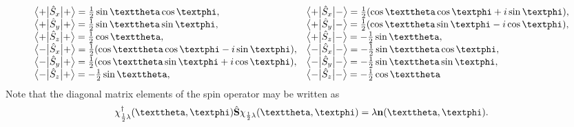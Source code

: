 \begin{equation}
\begin{array}{ll}
\braOket{+}{\hat{S}_{x}}{+}=\frac{1}{2} \sin \vartheta \cos \varphi, & \braOket{+}{\hat{S}_{x}}{-}=\frac{1}{2}(\cos \vartheta \cos \varphi+i \sin \varphi), \\
\braOket{+}{\hat{S}_{y}}{+}=\frac{1}{2} \sin \vartheta \sin \varphi, & \braOket{+}{\hat{S}_{y}}{-}=\frac{1}{2}(\cos \vartheta \sin \varphi-i \cos \varphi), \\
\braOket{+}{\hat{S}_{z}}{+}=\frac{1}{2} \cos \vartheta, & \braOket{+}{\hat{S}_{z}}{-}=-\frac{1}{2} \sin \vartheta, \label{eq:6:2:30}\\
\braOket{-}{\hat{S}_{x}}{+}=\frac{1}{2}(\cos \vartheta \cos \varphi-i \sin \varphi), & \braOket{-}{\hat{S}_{x}}{-}=-\frac{1}{2} \sin \vartheta \cos \varphi, \\
\braOket{-}{\hat{S}_{y}}{+}=\frac{1}{2}(\cos \vartheta \sin \varphi+i \cos \varphi), & \braOket{-}{\hat{S}_{y}}{-}=-\frac{1}{2} \sin \vartheta \sin \varphi, \\
\braOket{-}{\hat{S}_{z}}{+}=-\frac{1}{2} \sin \vartheta, & \braOket{-}{\hat{S}_{z}}{-}=-\frac{1}{2} \cos \vartheta
\end{array}
\end{equation}
Note that the diagonal matrix elements of the spin operator may be written as
\begin{equation}
\chi_{\frac{1}{2} \lambda}^{\dagger}(\vartheta, \varphi) \hat{\vect{S}} \chi_{\frac{1}{2} \lambda}(\vartheta, \varphi)=\lambda \vect{n}(\vartheta, \varphi) . \label{eq:6:2:31}
\end{equation}
